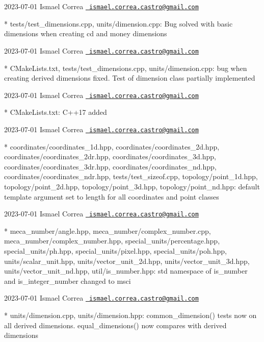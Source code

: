  2023-\/07-\/01 Ismael Correa \href{mailto:ismael.correa.castro@gmail.com}{\texttt{ ismael.\+correa.\+castro@gmail.\+com}} \begin{DoxyVerb}* tests/test_dimensions.cpp, units/dimension.cpp: Bug solved with
basic dimensions when creating cd and money dimensions
\end{DoxyVerb}
 2023-\/07-\/01 Ismael Correa \href{mailto:ismael.correa.castro@gmail.com}{\texttt{ ismael.\+correa.\+castro@gmail.\+com}} \begin{DoxyVerb}* CMakeLists.txt, tests/test_dimensions.cpp, units/dimension.cpp: 
bug when creating derived dimensions fixed. Test of dimension class
partially implemented
\end{DoxyVerb}
 2023-\/07-\/01 Ismael Correa \href{mailto:ismael.correa.castro@gmail.com}{\texttt{ ismael.\+correa.\+castro@gmail.\+com}} \begin{DoxyVerb}* CMakeLists.txt: C++17 added
\end{DoxyVerb}
 2023-\/07-\/01 Ismael Correa \href{mailto:ismael.correa.castro@gmail.com}{\texttt{ ismael.\+correa.\+castro@gmail.\+com}} \begin{DoxyVerb}* coordinates/coordinates_1d.hpp, coordinates/coordinates_2d.hpp,
coordinates/coordinates_2dr.hpp, coordinates/coordinates_3d.hpp,
coordinates/coordinates_3dr.hpp, coordinates/coordinates_nd.hpp,
coordinates/coordinates_ndr.hpp, tests/test_sizeof.cpp,
topology/point_1d.hpp, topology/point_2d.hpp,
topology/point_3d.hpp, topology/point_nd.hpp: default template
argument set to length for all coordinates and point classes
\end{DoxyVerb}
 2023-\/07-\/01 Ismael Correa \href{mailto:ismael.correa.castro@gmail.com}{\texttt{ ismael.\+correa.\+castro@gmail.\+com}} \begin{DoxyVerb}* meca_number/angle.hpp, meca_number/complex_number.cpp,
meca_number/complex_number.hpp, special_units/percentage.hpp,
special_units/ph.hpp, special_units/pixel.hpp,
special_units/poh.hpp, units/scalar_unit.hpp,
units/vector_unit_2d.hpp, units/vector_unit_3d.hpp,
units/vector_unit_nd.hpp, util/is_number.hpp: std namespace of
is_number and is_integer_number changed to msci
\end{DoxyVerb}
 2023-\/07-\/01 Ismael Correa \href{mailto:ismael.correa.castro@gmail.com}{\texttt{ ismael.\+correa.\+castro@gmail.\+com}} \begin{DoxyVerb}* units/dimension.cpp, units/dimension.hpp: common_dimension() tests
now on all derived dimensions. equal_dimensions() now compares with
derived dimensions
\end{DoxyVerb}
